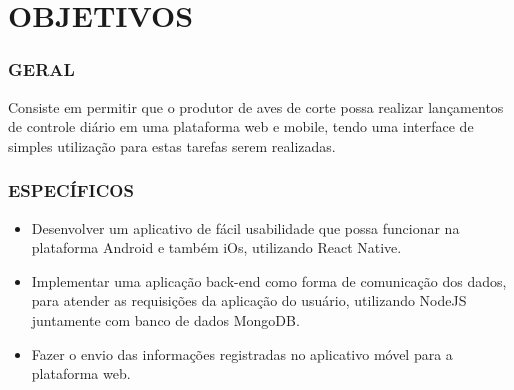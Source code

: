
\chapter{OBJETIVOS}
\label{chap:objetivos}

\subsection{GERAL}
\label{subsec:objgeral}
Consiste em permitir que o produtor de aves de corte possa realizar lançamentos de controle diário em uma plataforma web e mobile, tendo uma interface de simples utilização para estas tarefas serem realizadas.



\subsection{ESPECÍFICOS}
\label{subsec:objesp}

\begin{itemize}
   \item Desenvolver um aplicativo de fácil usabilidade que possa funcionar na plataforma Android e também iOs, utilizando React Native.
   \item Implementar uma aplicação back-end como forma de comunicação dos dados, para atender as requisições da aplicação do usuário, utilizando NodeJS juntamente com banco de dados MongoDB.
   \item Fazer o envio das informações registradas no aplicativo móvel para a plataforma web.
 \end{itemize}






